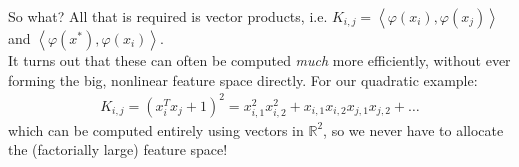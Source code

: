 So what? All that is required is vector products, i.e. $K_{i,j} =  \left\langle \varphi(x_i),\varphi(x_j) \right\rangle $ and $ \left\langle \varphi(x^*),\varphi(x_i) \right\rangle $.\\ It turns out that these can often be computed \emph{much} more efficiently, without ever forming the big, nonlinear feature space directly. \pause{}For our quadratic example:
\begin{align*}
K_{i,j} = \left(x_i^Tx_j +1\right)^2 = x_{i,1}^2x_{i,2}^2  + x_{i,1}x_{i,2}x_{j,1}x_{j,2} + \hdots 
\end{align*}
which can be computed entirely using vectors in $\mathbb{R}^2$, so we never have to allocate the (factorially large) feature space!